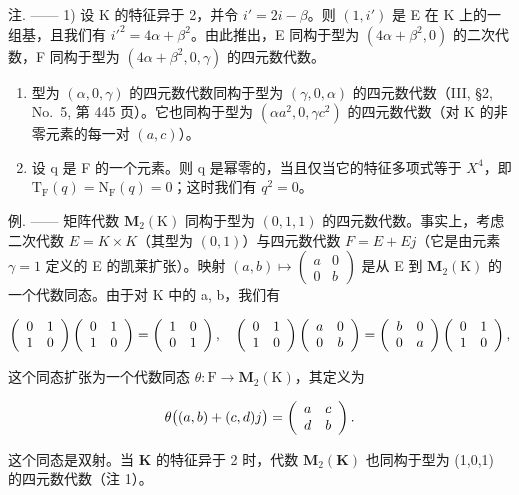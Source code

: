 注. —— 1) 设 K 的特征异于 2，并令 \(i' = 2i - \beta\)。则 \((1, i')\) 是 E 在 K 上的一组基，且我们有 \(i'^2 = 4\alpha + \beta^2\)。由此推出，E 同构于型为 \((4\alpha + \beta^2, 0)\) 的二次代数，F 同构于型为 \((4\alpha + \beta^2, 0, \gamma)\) 的四元数代数。

\begin{enumerate}
\def\labelenumi{\arabic{enumi})}
\setcounter{enumi}{1}
\item
  型为 \((\alpha,0,\gamma)\) 的四元数代数同构于型为 \((\gamma,0,\alpha)\) 的四元数代数（III, §2, No.~5, 第 445 页）。它也同构于型为 \((\alpha a^{2},0,\gamma c^{2})\) 的四元数代数（对 K 的非零元素的每一对 \((a,c)\)）。
\item
  设 q 是 F 的一个元素。则 q 是幂零的，当且仅当它的特征多项式等于 \(X^{4}\)，即 \(\mathrm{T}_{\mathrm{F}}(q)=\mathrm{N}_{\mathrm{F}}(q)=0\)；这时我们有 \(q^{2}=0\)。
\end{enumerate}

例. —— 矩阵代数 \(\mathbf{M}_{2}(\mathrm{K})\) 同构于型为 \((0,1,1)\) 的四元数代数。事实上，考虑二次代数 \(E = K \times K\)（其型为 \((0,1)\)）与四元数代数 \(F = E + Ej\)（它是由元素 \(\gamma = 1\) 定义的 E 的凯莱扩张）。映射 \((a,b) \mapsto \begin{pmatrix} a & 0 \\ 0 & b \end{pmatrix}\) 是从 E 到 \(\mathbf{M}_{2}(\mathrm{K})\) 的一个代数同态。由于对 K 中的 a, b，我们有

\[
\left( \begin{array}{c c} 0 & 1 \\ 1 & 0 \end{array} \right) \left( \begin{array}{c c} 0 & 1 \\ 1 & 0 \end{array} \right) = \left( \begin{array}{c c} 1 & 0 \\ 0 & 1 \end{array} \right), \quad \left( \begin{array}{c c} 0 & 1 \\ 1 & 0 \end{array} \right) \left( \begin{array}{c c} a & 0 \\ 0 & b \end{array} \right) = \left( \begin{array}{c c} b & 0 \\ 0 & a \end{array} \right) \left( \begin{array}{c c} 0 & 1 \\ 1 & 0 \end{array} \right),
\]

这个同态扩张为一个代数同态 \(\theta : \mathrm{F} \longrightarrow \mathbf{M}_2(\mathrm{K})\)，其定义为

\[
\theta \bigl ((a, b) + (c, d) j \bigr) = \left( \begin{array}{c c} a & c \\ d & b \end{array} \right)  .
\]

这个同态是双射。当 \(\mathbf{K}\) 的特征异于 2 时，代数 \(\mathbf{M}_2(\mathbf{K})\) 也同构于型为 (1,0,1) 的四元数代数（注 1）。

